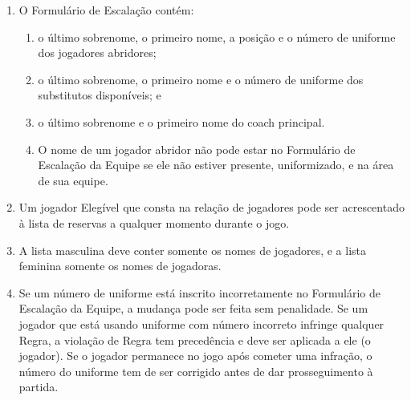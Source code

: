 \begin{enumerate}[label=(\alph*)]\item   O Formulário de Escalação contém:
	\begin{enumerate}[label=\roman*.]
		\item o último sobrenome, o primeiro nome, a posição e o número de uniforme dos jogadores abridores;
		\item  o último sobrenome, o primeiro nome e o número de uniforme dos substitutos disponíveis; e
		\item  o último sobrenome e o primeiro nome do \gls{coach} principal.
		\item  O nome de um jogador abridor não pode estar no Formulário de Escalação da Equipe se ele não estiver presente, uniformizado, e na área de sua equipe.
	\end{enumerate}
	\item  Um jogador Elegível que consta na relação de jogadores pode ser acrescentado à lista de reservas a qualquer momento durante o jogo.
	\item  A lista masculina deve conter somente os nomes de jogadores, e a lista  feminina somente os nomes de jogadoras.
	\item  Se um número de uniforme está inscrito incorretamente no Formulário de Escalação da Equipe, a mudança pode ser feita sem penalidade.
	Se um jogador que está usando uniforme com número incorreto infringe qualquer Regra, a  violação de Regra tem precedência e deve ser aplicada a ele (o jogador).
	Se o jogador permanece no jogo após cometer uma infração, o número do uniforme tem de ser corrigido antes de dar prosseguimento à partida.

\end{enumerate}

